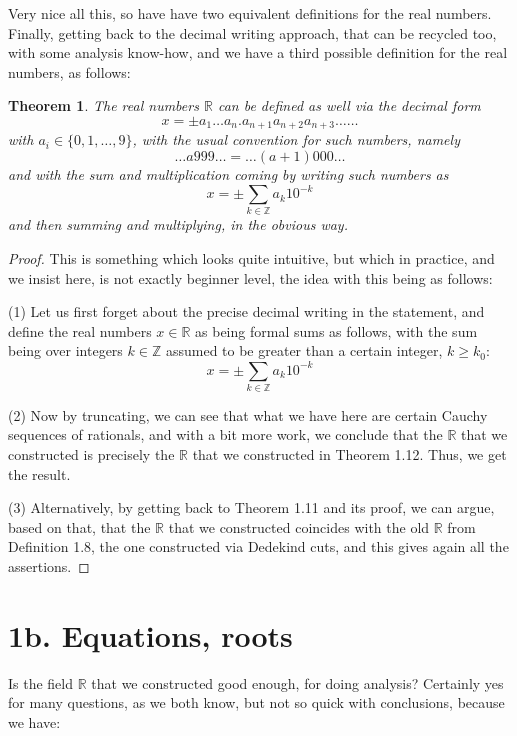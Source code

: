 \documentclass[12pt]{amsbook}
\newtheorem{theorem}{Theorem}[chapter]
\begin{document}
Very nice all this, so have have two equivalent definitions for the real numbers. Finally, getting back to the decimal writing approach, that can be recycled too, with some analysis know-how, and we have a third possible definition for the real numbers, as follows:

\begin{theorem}
The real numbers $\mathbb R$ can be defined as well via the decimal form
$$x=\pm a_1\ldots a_n.a_{n+1}a_{n+2}a_{n+3}\ldots\ldots$$
with $a_i\in\{0,1,\ldots,9\}$, with the usual convention for such numbers, namely
$$\ldots a999\ldots=\ldots(a+1)000\ldots$$
and with the sum and multiplication coming by writing such numbers as
$$x=\pm\sum_{k\in\mathbb Z}a_k10^{-k}$$
and then summing and multiplying, in the obvious way.
\end{theorem} 

\begin{proof}
This is something which looks quite intuitive, but which in practice, and we insist here, is not exactly beginner level, the idea with this being as follows:

\medskip

(1) Let us first forget about the precise decimal writing in the statement, and define the real numbers $x\in\mathbb R$ as being formal sums as follows, with the sum being over integers $k\in\mathbb Z$ assumed to be greater than a certain integer, $k\geq k_0$:
$$x=\pm\sum_{k\in\mathbb Z}a_k10^{-k}$$

(2) Now by truncating, we can see that what we have here are certain Cauchy sequences of rationals, and with a bit more work, we conclude that the $\mathbb R$ that we constructed is precisely the $\mathbb R$ that we constructed in Theorem 1.12. Thus, we get the result.

\medskip

(3) Alternatively, by getting back to Theorem 1.11 and its proof, we can argue, based on that, that the $\mathbb R$ that we constructed coincides with the old $\mathbb R$ from Definition 1.8, the one constructed via Dedekind cuts, and this gives again all the assertions.
\end{proof}

\section*{1b. Equations, roots}

Is the field $\mathbb R$ that we constructed good enough, for doing analysis? Certainly yes for many questions, as we both know, but not so quick with conclusions, because we have:
\end{document}
